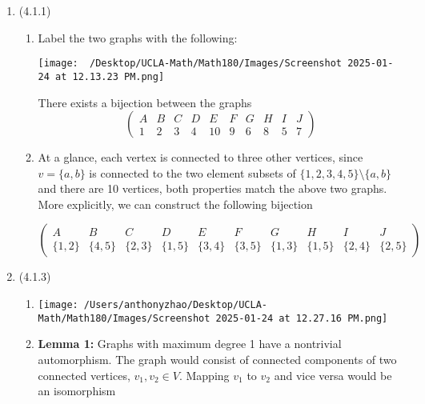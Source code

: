 \documentclass[12pt]{article}
\begin{document}

\begin{enumerate}[start=1,label={\bfseries Problem \arabic*:},leftmargin=1in] %
    \item (4.1.1)
    \begin{enumerate}
        \item Label the two graphs with the following:
    
        \texttt{[image: ~/Desktop/UCLA-Math/Math180/Images/Screenshot 2025-01-24 at 12.13.23 PM.png]}
        
        There exists a bijection between the graphs 
        \[
        \begin{pmatrix}
            A & B & C & D & E  & F & G & H & I & J  \\
            1 & 2 & 3 & 4 & 10 & 9 & 6 & 8 & 5 & 7
        \end{pmatrix}
    \]
    \item At a glance, each vertex is connected to three other vertices, since $v = \{ a, b\}$ is connected to the two element subsets of $\{ 1, 2, 3, 4, 5 \} \setminus \{a, b\}$ and there are 10 vertices, both properties match the above two graphs.
    More explicitly, we can construct the following  bijection

    \[
        \begin{pmatrix}
            A & B & C & D & E  & F & G & H & I & J  \\
            \{ 1, 2 \} & \{ 4, 5 \} & \{ 2, 3 \} & \{ 1, 5 \} & \{ 3, 4 \} & \{ 3, 5 \} & \{ 1, 3 \} & \{ 1, 5 \} & \{ 2, 4 \} & \{ 2, 5 \} 
        \end{pmatrix}
    \]
    \end{enumerate}
    
    \item (4.1.3)
    \begin{enumerate}
        \item \texttt{[image: /Users/anthonyzhao/Desktop/UCLA-Math/Math180/Images/Screenshot 2025-01-24 at 12.27.16 PM.png]}
        \item \textbf{Lemma 1:} Graphs with maximum degree 1 have a nontrivial automorphism. The graph would consist of connected components of two connected vertices, $v_{1}, v_{2} \in V$. Mapping $v_{1}$ to $v_{2}$ and vice versa would be an isomorphism
    

\end{enumerate}
\end{enumerate}
\end{document}
